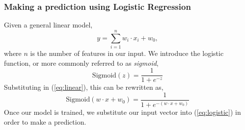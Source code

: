 \subsubsection{Making a prediction using Logistic Regression}
Given a general linear model,
\begin{equation}
    y = \sum^{n}_{i = 1} w_{i} \cdot x_{i} + w_{0},
    \label{eq:linear}
\end{equation}
where $n$ is the number of features in our input.
We introduce the logistic function, or more commonly referred to as \emph{sigmoid}\cite{10.5555/1671238},
\begin{equation}
    \mbox{Sigmoid}(z) = \frac{1}{1 + e^{-z}}
\end{equation}
Substituting in (\ref{eq:linear}), this can be rewritten as,
\begin{equation}
    \mbox{Sigmoid}(w \cdot x + w_{0}) = \frac{1}{1 + e^{-(w \cdot x + w_{0})}}
    \label{eq:logistic}
\end{equation}
Once our model is trained, we substitute our input vector into (\ref{eq:logistic}) in order to make a prediction.
